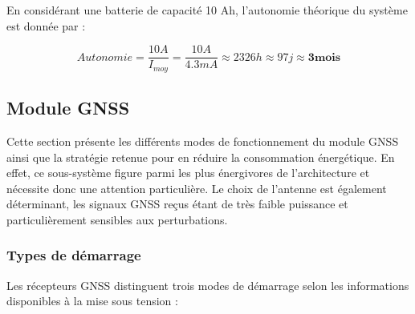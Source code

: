 \documentclass[12pt]{article}
\begin{document}
\noindent En considérant une batterie de capacité 10 Ah, l’autonomie théorique du système est donnée par :

\begin{equation}
	Autonomie = \frac{10A}{I_{moy}} = \frac{10A}{4.3mA} \approx 2326h \approx 97j \approx \bm{3mois}   
\end{equation}


\subsection{Module GNSS}\label{sect:moduleGNSS}

Cette section présente les différents modes de fonctionnement du module GNSS ainsi que la stratégie retenue pour en réduire la consommation énergétique. En effet, ce sous-système figure parmi les plus énergivores de l'architecture et nécessite donc une attention particulière. Le choix de l'antenne est également déterminant, les signaux GNSS reçus étant de très faible puissance et particulièrement sensibles aux perturbations.

\subsubsection{Types de démarrage}

Les récepteurs GNSS distinguent trois modes de démarrage selon les informations
disponibles à la mise sous tension :
\end{document}

